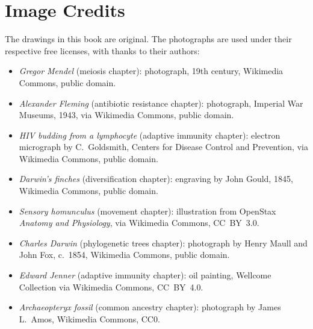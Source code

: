 \chapter*{Image Credits}

\begingroup\sloppy

The drawings in this book are original. The photographs are used
under their respective free licenses, with thanks to their authors:

\begin{itemize}
  \item \emph{Gregor Mendel} (meiosis chapter): photograph, 19th
        century, Wikimedia Commons, public domain.
  \item \emph{Alexander Fleming} (antibiotic resistance chapter):
        photograph, Imperial War Museums, 1943, via Wikimedia
        Commons, public domain.
  \item \emph{HIV budding from a lymphocyte} (adaptive immunity
        chapter): electron micrograph by C.~Goldsmith, Centers for
        Disease Control and Prevention, via Wikimedia Commons, public
        domain.
  \item \emph{Darwin's finches} (diversification chapter): engraving
        by John Gould, 1845, Wikimedia Commons, public domain.
  \item \emph{Sensory homunculus} (movement chapter): illustration
        from OpenStax \emph{Anatomy and Physiology}, via Wikimedia
        Commons, CC~BY~3.0.
  \item \emph{Charles Darwin} (phylogenetic trees chapter):
        photograph by Henry Maull and John Fox, c.~1854, Wikimedia
        Commons, public domain.
  \item \emph{Edward Jenner} (adaptive immunity chapter): oil
        painting, Wellcome Collection via Wikimedia Commons,
        CC~BY~4.0.
  \item \emph{Archaeopteryx fossil} (common ancestry chapter):
        photograph by James L.~Amos, Wikimedia Commons, CC0.
\end{itemize}

